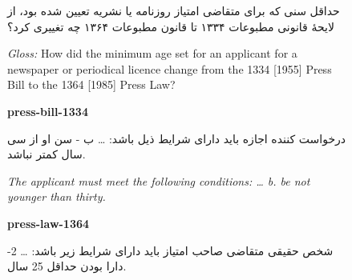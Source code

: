 \begin{figure}[tp]
\centering
{}
\begin{tcolorbox}[excard, title={Question\enspace LAW-fa\enspace T3, cross-version}]
\begin{otherlanguage}{persian}
حداقل سنی که برای متقاضی امتیاز روزنامه یا نشریه تعیین شده بود، از لایحهٔ قانونی مطبوعات ۱۳۳۴ تا قانون مطبوعات ۱۳۶۴ چه تغییری کرد؟\par
\end{otherlanguage}
{\footnotesize\color{cAxis}\textit{Gloss:} How did the minimum age set for an applicant for a newspaper or periodical licence change from the 1334 [1955] Press Bill to the 1364 [1985] Press Law?\par}
\end{tcolorbox}
\begin{tcolorbox}[excard, title={Evidence bundle\enspace two documents}]
\begin{tcolorbox}[exdoc]
{\footnotesize\bfseries press-bill-1334}\par
\begin{otherlanguage}{persian}
درخواست کننده اجازه باید دارای شرایط ذیل باشد: \ldots{} ب - سن او از سی سال کمتر نباشد.\par
\end{otherlanguage}
{\footnotesize\color{cAxis}\textit{The applicant must meet the following conditions: \ldots{} b. be not younger than thirty.}\par}
\end{tcolorbox}
\begin{tcolorbox}[exdoc, colframe=cLex, colback=cLex!6]
{\footnotesize\bfseries press-law-1364}\par
\begin{otherlanguage}{persian}
شخص حقیقی متقاضی صاحب امتیاز باید دارای شرایط زیر باشد: \ldots{} 2- دارا بودن حداقل 25 سال.\par

\end{otherlanguage}
\end{tcolorbox}
\end{tcolorbox}
\end{figure}
